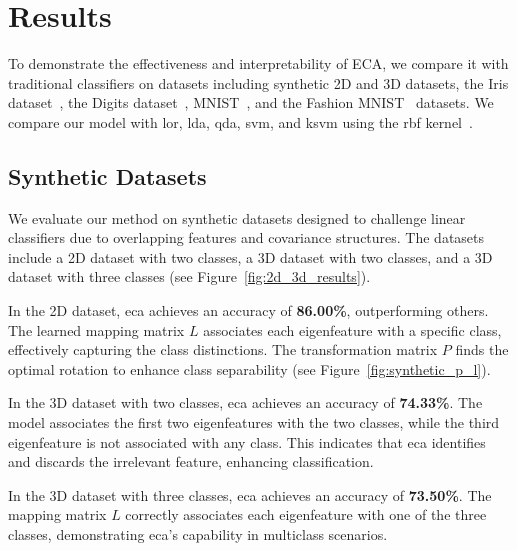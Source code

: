 \documentclass[conference]{IEEEtran}
\begin{document}
\section{Results}

To demonstrate the effectiveness and interpretability of ECA, we compare it with traditional classifiers on datasets including synthetic 2D and 3D datasets, the Iris dataset~\cite{fisher1936use}, the Digits dataset~\cite{alpaydin1998optical}, MNIST~\cite{lecun1998gradient}, and the Fashion MNIST~\cite{xiao2017fashion} datasets. We compare our model with \Gls{lor}, \Gls{lda}, \Gls{qda}, \Gls{svm}, and \Gls{ksvm} using the \Gls{rbf} kernel~\cite{hastie2009elements,cortes1995support,burges1998tutorial}.

\subsection{Synthetic Datasets}

We evaluate our method on synthetic datasets designed to challenge linear classifiers due to overlapping features and covariance structures. The datasets include a 2D dataset with two classes, a 3D dataset with two classes, and a 3D dataset with three classes (see Figure~\ref{fig:2d_3d_results}).

In the 2D dataset, \Gls{eca} achieves an accuracy of \textbf{86.00\%}, outperforming others. The learned mapping matrix \( L \) associates each eigenfeature with a specific class, effectively capturing the class distinctions. The transformation matrix \( P \) finds the optimal rotation to enhance class separability (see Figure~\ref{fig:synthetic_p_l}).

In the 3D dataset with two classes, \Gls{eca} achieves an accuracy of \textbf{74.33\%}. The model associates the first two eigenfeatures with the two classes, while the third eigenfeature is not associated with any class. This indicates that \Gls{eca} identifies and discards the irrelevant feature, enhancing classification.

In the 3D dataset with three classes, \Gls{eca} achieves an accuracy of \textbf{73.50\%}. The mapping matrix \( L \) correctly associates each eigenfeature with one of the three classes, demonstrating \Gls{eca}'s capability in multiclass scenarios.
\end{document}
